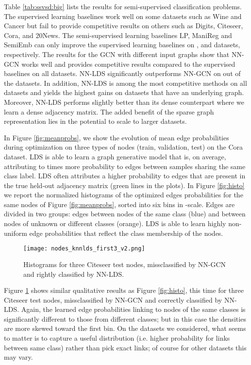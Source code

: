 \documentclass{article}
\newcommand{\lds}{\textsc{LDS}\xspace}
\begin{document}
Table \ref{tab:ssvsd:big} lists the results for semi-supervised classification problems. The supervised learning baselines work well on some datasets such as Wine and Cancer but fail to provide competitive results on others such as Digits, Citeseer, Cora, and 20News. 
The semi-supervised learning baselines LP, ManiReg and SemiEmb can only improve the supervised learning baselines on ,  and  datasets, respectively. The results for the GCN with different input graphs show that NN-GCN works well and provides competitive results compared to the supervised baselines on all datasets. 
NN-\lds significantly outperforms NN-GCN on  out of the  datasets. In addition, NN-\lds is among the most competitive methods on all datasets and yields the highest gains on datasets that have an underlying graph. Moreover, NN-\lds performs slightly better than its dense counterpart where we learn a dense adjacency matrix. The added benefit of the sparse graph representation lies in the potential to scale to larger datasets.

In Figure \ref{fig:meanprobs}, we show the evolution of mean edge probabilities during optimization on three types of nodes (train, validation, test) on the Cora dataset.  \lds is able to learn a graph generative model that is, on average, attributing  to  times more probability to edges between samples sharing the same class label. 
\lds often attributes a higher probability to edges that are present in the true held-out adjacency matrix (green lines in the plots).
In Figure \ref{fig:histo} we report the normalized histograms of the optimized edges probabilities for the same nodes of Figure \ref{fig:meanprobs}, sorted into six bins in -scale. Edges are divided in two groups: edges between nodes of the same class (blue) and between nodes of unknown or different classes (orange). \lds is able to learn highly non-uniform edge probabilities that reflect the class membership of the nodes. 
\begin{figure}[t!]
    \centering
    \texttt{[image: nodes\_knnlds\_first3\_v2.png]}
    \vspace{-2mm}
    \caption{
Histograms for three Citeseer test nodes, missclassified by NN-GCN and rightly classified by NN-\lds.}
    \label{fig:missnodesHist}
    \vspace{-6mm}
\end{figure}
Figure \ref{fig:missnodesHist} shows similar qualitative results as Figure \ref{fig:histo}, this time for three Citeseer test nodes, missclassified by NN-GCN and correctly classified by NN-\lds. Again, the learned edge probabilities linking to nodes of the same classes is significantly different to those from different classes; but in this case the densities are more skewed toward the first bin. 
On the datasets we considered, what seems to matter is to capture a useful distribution (i.e. higher probability for links between same class) rather than pick exact links; of course for other datasets this may vary. 
\end{document}
